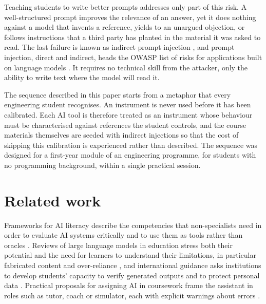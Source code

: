 \documentclass[11pt,a4paper]{article}
\begin{document}
Teaching students to write better prompts addresses only part of this risk. A well-structured
prompt improves the relevance of an answer, yet it does nothing against a model that invents a
reference, yields to an unargued objection, or follows instructions that a third party has
planted in the material it was asked to read. The last failure is known as indirect
prompt injection \cite{greshake2023}, and prompt injection, direct and indirect, heads the
OWASP list of risks for applications built on language models \cite{owasp2025}. It requires no technical skill from the attacker, only
the ability to write text where the model will read it.

The sequence described in this paper starts from a metaphor that every engineering student
recognises. An instrument is never used before it has been calibrated. Each AI tool is
therefore treated as an instrument whose behaviour must be characterised against references
the student controls, and the course materials themselves are seeded with indirect injections
so that the cost of skipping this calibration is experienced rather than described. The
sequence was designed for a first-year module of an engineering programme, for students with no
programming background, within a single practical session.

\section{Related work}

Frameworks for AI literacy describe the competencies that non-specialists need in order to
evaluate AI systems critically and to use them as tools rather than oracles
\cite{long2020}. Reviews of large language models in education stress both their potential and
the need for learners to understand their limitations, in particular fabricated content and
over-reliance \cite{kasneci2023}, and international guidance asks institutions to develop
students' capacity to verify generated outputs and to protect personal data \cite{unesco2023}.
Practical proposals for assigning AI in coursework frame the assistant in roles such as tutor,
coach or simulator, each with explicit warnings about errors \cite{mollick2023}.
\end{document}
